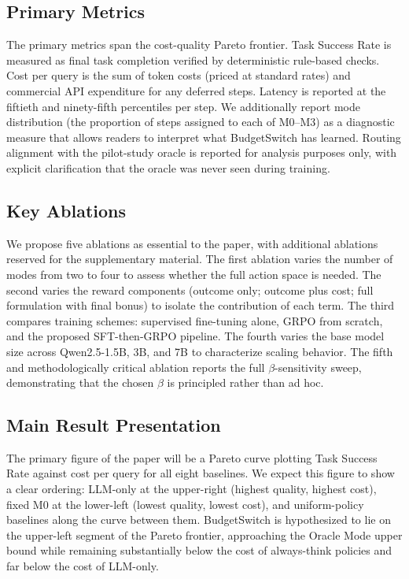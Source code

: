 \documentclass[11pt,a4paper]{article}
\begin{document}
\subsection{Primary Metrics}

The primary metrics span the cost-quality Pareto frontier. Task Success Rate is measured as final task completion verified by deterministic rule-based checks. Cost per query is the sum of token costs (priced at standard rates) and commercial API expenditure for any deferred steps. Latency is reported at the fiftieth and ninety-fifth percentiles per step. We additionally report mode distribution (the proportion of steps assigned to each of M0--M3) as a diagnostic measure that allows readers to interpret what BudgetSwitch has learned. Routing alignment with the pilot-study oracle is reported for analysis purposes only, with explicit clarification that the oracle was never seen during training.

\subsection{Key Ablations}

We propose five ablations as essential to the paper, with additional ablations reserved for the supplementary material. The first ablation varies the number of modes from two to four to assess whether the full action space is needed. The second varies the reward components (outcome only; outcome plus cost; full formulation with final bonus) to isolate the contribution of each term. The third compares training schemes: supervised fine-tuning alone, GRPO from scratch, and the proposed SFT-then-GRPO pipeline. The fourth varies the base model size across Qwen2.5-1.5B, 3B, and 7B to characterize scaling behavior. The fifth and methodologically critical ablation reports the full $\beta$-sensitivity sweep, demonstrating that the chosen $\beta$ is principled rather than ad hoc.

\subsection{Main Result Presentation}

The primary figure of the paper will be a Pareto curve plotting Task Success Rate against cost per query for all eight baselines. We expect this figure to show a clear ordering: LLM-only at the upper-right (highest quality, highest cost), fixed M0 at the lower-left (lowest quality, lowest cost), and uniform-policy baselines along the curve between them. BudgetSwitch is hypothesized to lie on the upper-left segment of the Pareto frontier, approaching the Oracle Mode upper bound while remaining substantially below the cost of always-think policies and far below the cost of LLM-only.
\end{document}

